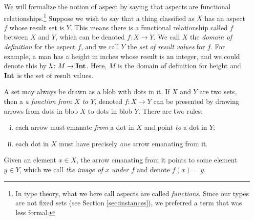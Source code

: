 \documentclass{amsart}
\def\to{\rightarrow}
\def\taking{\colon}
\def\id{\tn{id}}
\theoremstyle{remark}
\theoremstyle{definition}
\def\tn{\textnormal}
\begin{document}
We will formalize the notion of aspect by saying that aspects are functional relationships.\footnote{In type theory, what we here call aspects are called {\em functions}. Since our types are not fixed sets (see Section \ref{sec:instances}), we preferred a term that was less formal.} Suppose we wish to say that a thing classified as $X$ has an aspect $f$ whose result set is $Y$.  This means there is a functional relationship called $f$ between $X$ and $Y$, which can be denoted $f\taking X\to Y$.  We call $X$ the {\em domain of definition} for the aspect $f$, and we call $Y$ the {\em set of result values} for $f$. For example, a man has a height in inches whose result is an integer, and we could denote this by $h\taking M\to{\bf Int}$. Here, $M$ is the domain of definition for height and ${\bf Int}$ is the set of result values. 

A set may always be drawn as a blob with dots in it. If $X$ and $Y$ are two sets, then a {\em a function from $X$ to $Y$}, denoted $f\taking X\to Y$ can be presented by drawing arrows from dots in blob $X$ to dots in blob $Y$. There are two rules: \begin{enumerate}[(i)]\item each arrow must emanate {\em from} a dot in $X$ and point {\em to} a dot in $Y$;\item each dot in $X$ must have precisely {\em one} arrow emanating from it.\end{enumerate}  Given an element $x\in X$, the arrow emanating from it points to some element $y\in Y$, which we call {\em the image of $x$ under $f$} and denote $f(x)=y$. %
\end{document}
